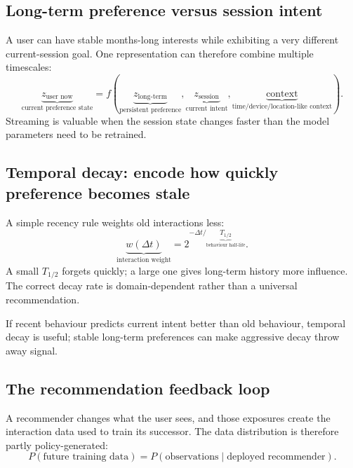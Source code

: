 \subsection{Long-term preference versus session intent}
\label{sec:personalisation-timescales}
A user can have stable months-long interests while exhibiting a very different current-session goal.
One representation can therefore combine multiple timescales:
\[
\underbrace{z_{\text{user now}}}_{\text{current preference state}}
=
f(
\underbrace{z_{\text{long-term}}}_{\text{persistent preference}},
\underbrace{z_{\text{session}}}_{\text{current intent}},
\underbrace{\text{context}}_{\text{time/device/location-like context}}
).
\]
Streaming is valuable when the session state changes faster than the model parameters need to be retrained.

\subsection{Temporal decay: encode how quickly preference becomes stale}
\label{sec:personalisation-temporal-decay}
A simple recency rule weights old interactions less:
\[
\boxed{
\underbrace{w(\Delta t)}_{\text{interaction weight}}
=
2^{-\Delta t/\underbrace{T_{1/2}}_{\text{behaviour half-life}}}.
}
\]
A small $T_{1/2}$ forgets quickly; a large one gives long-term history more influence.
The correct decay rate is domain-dependent rather than a universal recommendation.

\begin{calloutbias}
If recent behaviour predicts current intent better than old behaviour, temporal decay is useful; stable long-term preferences can make aggressive decay throw away signal.
\end{calloutbias}

\subsection{The recommendation feedback loop}
\label{sec:personalisation-feedback-loop}
A recommender changes what the user sees, and those exposures create the interaction data used to train its successor.
The data distribution is therefore partly policy-generated:
\[
\boxed{
P(\text{future training data})
=
P(
\text{observations}
\mid
\text{deployed recommender}
).
}
\]

